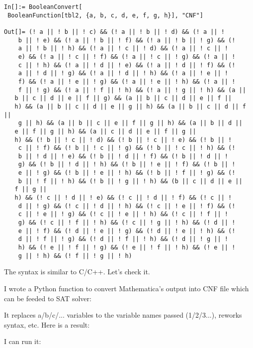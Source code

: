 \begin{lstlisting}
In[]:= BooleanConvert[
 BooleanFunction[tbl2, {a, b, c, d, e, f, g, h}], "CNF"]

Out[]= (! a || ! b || ! c) && (! a || ! b || ! d) && (! a || ! 
    b || ! e) && (! a || ! b || ! f) && (! a || ! b || ! g) && (! 
    a || ! b || ! h) && (! a || ! c || ! d) && (! a || ! c || ! 
    e) && (! a || ! c || ! f) && (! a || ! c || ! g) && (! a || ! 
    c || ! h) && (! a || ! d || ! e) && (! a || ! d || ! f) && (! 
    a || ! d || ! g) && (! a || ! d || ! h) && (! a || ! e || ! 
    f) && (! a || ! e || ! g) && (! a || ! e || ! h) && (! a || ! 
    f || ! g) && (! a || ! f || ! h) && (! a || ! g || ! h) && (a || 
   b || c || d || e || f || g) && (a || b || c || d || e || f || 
   h) && (a || b || c || d || e || g || h) && (a || b || c || d || f ||
    g || h) && (a || b || c || e || f || g || h) && (a || b || d || 
   e || f || g || h) && (a || c || d || e || f || g || 
   h) && (! b || ! c || ! d) && (! b || ! c || ! e) && (! b || ! 
    c || ! f) && (! b || ! c || ! g) && (! b || ! c || ! h) && (! 
    b || ! d || ! e) && (! b || ! d || ! f) && (! b || ! d || ! 
    g) && (! b || ! d || ! h) && (! b || ! e || ! f) && (! b || ! 
    e || ! g) && (! b || ! e || ! h) && (! b || ! f || ! g) && (! 
    b || ! f || ! h) && (! b || ! g || ! h) && (b || c || d || e || 
   f || g || 
   h) && (! c || ! d || ! e) && (! c || ! d || ! f) && (! c || ! 
    d || ! g) && (! c || ! d || ! h) && (! c || ! e || ! f) && (! 
    c || ! e || ! g) && (! c || ! e || ! h) && (! c || ! f || ! 
    g) && (! c || ! f || ! h) && (! c || ! g || ! h) && (! d || ! 
    e || ! f) && (! d || ! e || ! g) && (! d || ! e || ! h) && (! 
    d || ! f || ! g) && (! d || ! f || ! h) && (! d || ! g || ! 
    h) && (! e || ! f || ! g) && (! e || ! f || ! h) && (! e || ! 
    g || ! h) && (! f || ! g || ! h)
\end{lstlisting}

The syntax is similar to C/C++.
Let's check it.

I wrote a Python function to convert Mathematica's output into CNF file which can be feeded to SAT solver:



It replaces a/b/c/... variables to the variable names passed (1/2/3...), reworks syntax, etc.
Here is a result:



I can run it:


